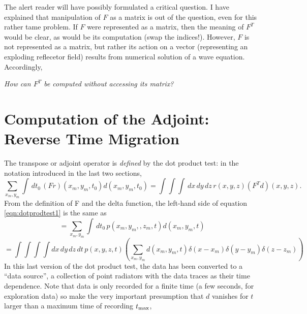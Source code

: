 
 

The alert reader will have possibly formulated a critical question. I have explained that manipulation of $F$ as a matrix is out of the question, even for this rather tame problem. If $F$ were represented as a matrix, then the meaning of $F^T$ would be clear, as would be its computation (swap the indices!).  However, $F$ is not represented as a matrix, but rather its action on a vector (representing an exploding reflecetor field) results from numerical solution of a wave equation. Accordingly,

{\em How can $F^T$ be computed without accessing its matrix?}

\section{Computation of the Adjoint: Reverse Time Migration}
The transpose or adjoint operator is {\em defined} by the dot product test: in the notation introduced in the last two sections, 
\begin{equation}
\label{eqn:dotprodtest1}
\sum_{x_m,y_m}\int \,dt_0\,(Fr)(x_m,y_m,t_0)d(x_m,y_m,t_0) 
=\int\int\int \,dx\,dy\,dz\,r(x,y,z)(F^T d)(x,y,z).
\end{equation}
From the definition of F and the delta function, the left-hand side of equation \ref{eqn:dotprodtest1} is the same as
\[
=\sum_{x_m,y_m}\int \,dt_0\,p(x_m,y_m,,z_m,t)d(x_m,y_m,t) 
\]
\begin{equation}
\label{eqn:dotprodrecast}
=\int \int \int \int dx\,dy\,dz\,dt\,p(x,y,z,t)\left(\sum_{x_m,y_m}d(x_m,y_m,t) \delta(x-x_m)\delta(y-y_m)\delta(z-z_m)\right)
\end{equation}
In this last version of the dot product test, the data has been converted to a ``data source'', a collection of point radiators with the data traces as their time dependence. Note that data is only recorded for a finite time (a few seconds, for exploration data) so make the very important presumption that $d$ vanishes for $t$ larger than a maximum time of recording $t_{\rm max}$, 

